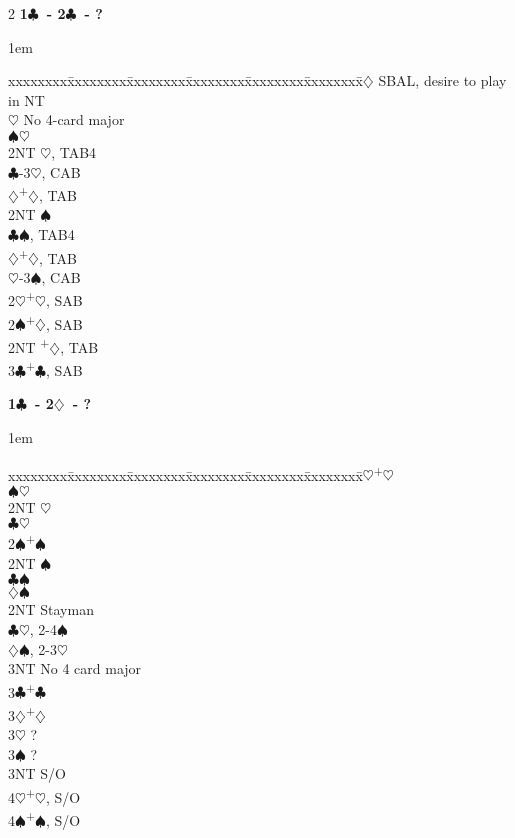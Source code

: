 \documentclass[10pt]{article}
\renewcommand{\c}{$\clubsuit$}
\renewcommand{\d}{$\diamondsuit$}
\newcommand{\h}{$\heartsuit$}
\newcommand{\s}{$\spadesuit$}
\newcommand{\p}{\textsuperscript{+}}
\newenvironment{bidtable}[1][]
{\textbf{#1}
  \begin{adjustwidth}{1em}{}
    \addvspace{2pt}
    \begin{tabbing}
      xxxxxxxx\=xxxxxxxx\=xxxxxxxx\=xxxxxxxx\=xxxxxxxx\=xxxxxxxx\=\kill}
{\end{tabbing}\end{adjustwidth}\bigskip}%
\begin{document}
\begin{multicols*}{2}
\begin{bidtable}[1\c\ - 2\c\ - ?]
2\d \> SBAL, desire to play in NT \\
    \h \> No 4-card major     \\
    \s {}\h                 \\
    \>     \> 2NT \h, TAB4    \\
    \>     \c {}-3\h, CAB   \\
    \>     \d {}\p\d, TAB   \\
    \> 2NT \s                 \\
    \>     \c {}\s, TAB4    \\
    \>     \d {}\p\d, TAB   \\
    \>     \h {}-3\s, CAB   \\
2\h {}\p\h, SAB                 \\
2\s {}\p\d, SAB                 \\
2NT \p\d, TAB                 \\
3\c {}\p\c, SAB
\end{bidtable}

\begin{bidtable}[1\c\ - 2\d\ - ?]
2\h {}\p\h                  \\
    \s {}\h             \\
    \> 2NT \h             \\
    \c {}\h             \\
2\s {}\p\s                  \\
    \> 2NT \s             \\
    \c {}\s             \\
    \d {}\s             \\
2NT \> Stayman                \\
    \c {}\h, 2-4\s      \\
    \d {}\s, 2-3\h      \\
    \> 3NT \> No 4 card major \\
3\c {}\p\c                  \\
3\d {}\p\d                  \\
3\h \> ?                      \\
3\s \> ?                      \\
3NT \> S/O                    \\
4\h {}\p\h, S/O             \\
4\s {}\p\s, S/O             \\
\end{bidtable}


\end{multicols*}
\end{document}
